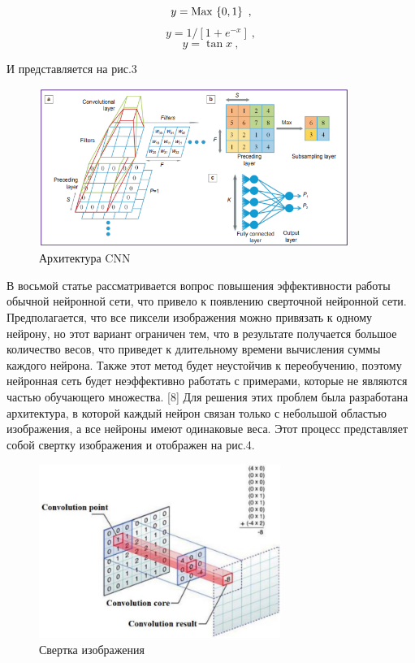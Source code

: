 \documentclass{svproc}
\begin{document}
\begin{equation}
  y = {\rm Max\,} \left\{0,1\right\}\ ,
\end{equation}
\begin{equation}
  y = 1/[1+e^{-x}]\ ,
\end{equation}
\begin{equation}
  y = \tan{x}\ ,
\end{equation}

И представляется на рис.3

\begin{figure}[h]
    \centering
    \includegraphics[width=0.90\textwidth]{picture_3}
    \caption{Архитектура CNN}
    \label{fig:picture_3}
\end{figure}

В восьмой статье рассматривается вопрос повышения эффективности работы обычной нейронной сети, что привело к появлению сверточной нейронной сети. Предполагается, что все пиксели изображения можно привязать к одному нейрону, но этот вариант ограничен тем, что в результате получается большое количество весов, что приведет к длительному времени вычисления суммы каждого нейрона. Также этот метод будет неустойчив к переобучению, поэтому нейронная сеть будет неэффективно работать с примерами, которые не являются частью обучающего множества. [8] Для решения этих проблем была разработана архитектура, в которой каждый нейрон связан только с небольшой областью изображения, а все нейроны имеют одинаковые веса. Этот процесс представляет собой свертку изображения и отображен на рис.4.

\begin{figure}[h]
    \centering
    \includegraphics[width=0.70\textwidth]{picture_4}
    \caption{Свертка изображения}
    \label{fig:picture_4}
\end{figure}
\end{document}
